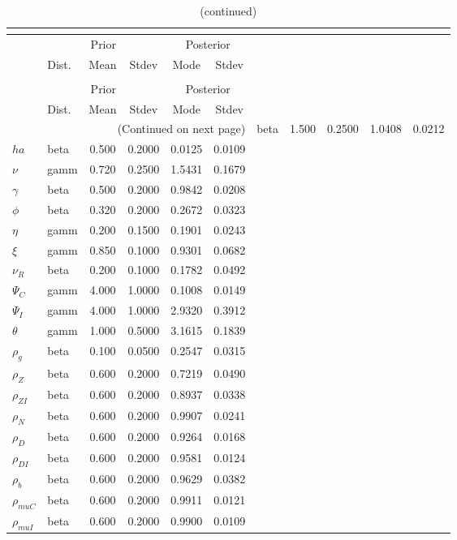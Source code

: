  
\begin{center}
\begin{longtable}{llcccc} 
\caption{Results from posterior maximization (parameters)}\\
 \label{Table:Posterior:1}\\
\toprule 
  & \multicolumn{3}{c}{Prior}  &  \multicolumn{2}{c}{Posterior} \\
  \cmidrule(r{.75em}){2-4} \cmidrule(r{.75em}){5-6}
  & Dist. & Mean  & Stdev & Mode & Stdev \\ 
\midrule \endfirsthead 
\caption{(continued)}\\
 \bottomrule 
  & \multicolumn{3}{c}{Prior}  &  \multicolumn{2}{c}{Posterior} \\
  \cmidrule(r{.75em}){2-4} \cmidrule(r{.75em}){5-6}
  & Dist. & Mean  & Stdev & Mode & Stdev \\ 
\midrule \endhead 
\bottomrule \multicolumn{6}{r}{(Continued on next page)}\endfoot 
\bottomrule\endlastfoot 
${\sigma}$ & beta &   1.500 & 0.2500 &   1.0408 &  0.0212 \\ 
${ha}$ & beta &   0.500 & 0.2000 &   0.0125 &  0.0109 \\ 
$\nu$ & gamm &   0.720 & 0.2500 &   1.5431 &  0.1679 \\ 
$\gamma$ & beta &   0.500 & 0.2000 &   0.9842 &  0.0208 \\ 
${\phi}$ & beta &   0.320 & 0.2000 &   0.2672 &  0.0323 \\ 
${\eta}$ & gamm &   0.200 & 0.1500 &   0.1901 &  0.0243 \\ 
$\xi$ & gamm &   0.850 & 0.1000 &   0.9301 &  0.0682 \\ 
${\nu_R}$ & beta &   0.200 & 0.1000 &   0.1782 &  0.0492 \\ 
${\Psi_{C}}$ & gamm &   4.000 & 1.0000 &   0.1008 &  0.0149 \\ 
${\Psi_I}$ & gamm &   4.000 & 1.0000 &   2.9320 &  0.3912 \\ 
${\theta}$ & gamm &   1.000 & 0.5000 &   3.1615 &  0.1839 \\ 
${\rho_g}$ & beta &   0.100 & 0.0500 &   0.2547 &  0.0315 \\ 
${\rho_Z}$ & beta &   0.600 & 0.2000 &   0.7219 &  0.0490 \\ 
${\rho_{ZI}}$ & beta &   0.600 & 0.2000 &   0.8937 &  0.0338 \\ 
${\rho_N}$ & beta &   0.600 & 0.2000 &   0.9907 &  0.0241 \\ 
${\rho_D}$ & beta &   0.600 & 0.2000 &   0.9264 &  0.0168 \\ 
${\rho_{DI}}$ & beta &   0.600 & 0.2000 &   0.9581 &  0.0124 \\ 
${\rho_b}$ & beta &   0.600 & 0.2000 &   0.9629 &  0.0382 \\ 
${\rho_{muC}}$ & beta &   0.600 & 0.2000 &   0.9911 &  0.0121 \\ 
${\rho_{muI}}$ & beta &   0.600 & 0.2000 &   0.9900 &  0.0109 \\ 
\end{longtable}
 \end{center}
